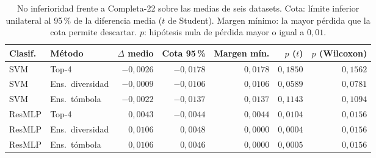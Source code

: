 \begin{table}[H]
\centering\fontsize{8}{10}\selectfont\setlength{\tabcolsep}{3.0pt}
\caption{No inferioridad frente a Completa-22 sobre las medias de seis datasets. Cota: límite inferior unilateral al 95\,\% de la diferencia media ($t$ de Student). Margen mínimo: la mayor pérdida que la cota permite descartar. $p$: hipótesis nula de pérdida mayor o igual a $0{,}01$.}
\label{tab:sel-noninferiority}
\begin{tabular}{@{}llrrrrr@{}}
\toprule
Clasif. & Método & $\Delta$ medio & Cota 95\,\% & Margen mín. & $p$ ($t$) & $p$ (Wilcoxon) \\
\midrule
SVM & Top-4 & $-0{,}0026$ & $-0{,}0178$ & $0{,}0178$ & $0{,}1850$ & $0{,}1562$ \\
SVM & Ens.\ diversidad & $-0{,}0009$ & $-0{,}0106$ & $0{,}0106$ & $0{,}0589$ & $0{,}0781$ \\
SVM & Ens.\ tómbola & $-0{,}0022$ & $-0{,}0137$ & $0{,}0137$ & $0{,}1143$ & $0{,}1094$ \\
ResMLP & Top-4 & $0{,}0043$ & $-0{,}0044$ & $0{,}0044$ & $0{,}0104$ & $0{,}0156$ \\
ResMLP & Ens.\ diversidad & $0{,}0106$ & $0{,}0048$ & $0{,}0000$ & $0{,}0004$ & $0{,}0156$ \\
ResMLP & Ens.\ tómbola & $0{,}0106$ & $0{,}0046$ & $0{,}0000$ & $0{,}0005$ & $0{,}0156$ \\
\bottomrule
\end{tabular}
\end{table}
